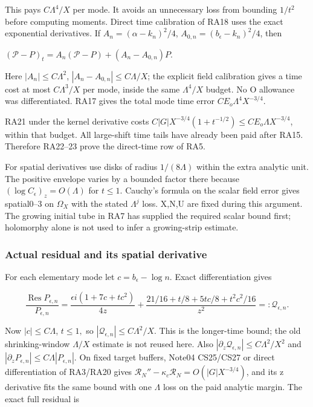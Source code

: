 This pays \(C \Lambda^{4}/X\) per mode. It avoids an unnecessary loss from bounding \(1/t^{2}\) before computing moments. Direct time calibration of RA18 uses the exact exponential derivatives. If \(A_{n}=(\alpha-k_{n})^{2}/4\), \(A_{0,n}=(b_{\epsilon}-k_{n})^{2}/4\), then

\((\mathcal P-P)_{t}=A_{n}(\mathcal P-P)+(A_{n}-A_{0,n})P\).

Here \(|A_{n}|\le C \Lambda^{2}\), \(|A_{n}-A_{0,n}|\le C \Lambda/X\); the explicit field calibration gives a time cost at most \(C \Lambda^{3}/X\) per mode, inside the same \(\Lambda^{4}/X\) budget. No O allowance was differentiated. RA17 gives the total mode time error \(C E_{o} \Lambda^{4} X^{-3/4}\).

RA21 under the kernel derivative costs \(C|G|X^{-3/4}(1+t^{-1/2})\le C E_{o} \Lambda X^{-3/4}\), within that budget. All large-shift time tails have already been paid after RA15. Therefore RA22--23 prove the direct-time row of RA5.

For spatial derivatives use disks of radius \(1/(8 \Lambda)\) within the extra analytic unit. The positive envelope varies by a bounded factor there because \((\log C_{\epsilon})_{z}=O(\Lambda)\) for \(t\le 1.\) Cauchy's formula on the scalar field error gives spatial0--3 on \(\Omega_{X}\) with the stated \(\Lambda^{j}\) loss. X,N,U are fixed during this argument. The growing initial tube in RA7 has supplied the required scalar bound first; holomorphy alone is not used to infer a growing-strip estimate.

\subsubsection{Actual residual and its spatial derivative}
\label{subsec:ra-6}

For each elementary mode let \(c=b_{\epsilon}-\log n\). Exact differentiation gives

\[
\frac{\operatorname{Res}P_{\epsilon,n}}{P_{\epsilon,n}}
 =\frac{\epsilon i(1+7c+t c^2)}{4z}
  +\frac{21/16+t/8+5tc/8+t^2c^2/16}{z^2}
 =:\mathcal Q_{\epsilon,n}.
\tag{RA24}\label{eq:ansatz-ra24}
\]

Now \(|c|\le C \Lambda\), \(t\le 1,\) so \(|\mathcal Q_{\epsilon,n}|\le C \Lambda^{2}/X\). This is the longer-time bound; the old shrinking-window \(\Lambda/X\) estimate is not reused here. Also \(|\partial_{z} \mathcal Q_{\epsilon,n}|\le C \Lambda^{2}/X^{2}\) and \(|\partial_{z} P_{\epsilon,n}|\le C \Lambda|P_{\epsilon,n}|\). On fixed target buffers, Note04 CS25/CS27 or direct differentiation of RA3/RA20 gives \(\mathcal R_N''-\kappa_{c} \mathcal R_N=O(|G|X^{-3/4})\), and its z derivative fits the same bound with one \(\Lambda\) loss on the paid analytic margin. The exact full residual is

